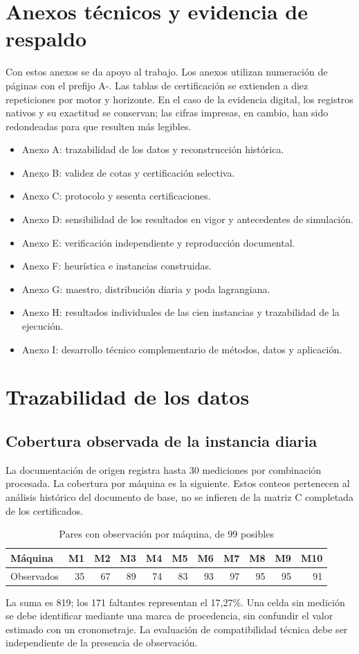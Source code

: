 \documentclass[12pt,a4paper,oneside]{article}
\begin{document}
\section*{Anexos técnicos y evidencia de respaldo}
Con estos anexos se da apoyo al trabajo. Los anexos utilizan numeración de páginas con el prefijo A-. Las tablas de certificación se extienden a diez repeticiones por motor y horizonte. En el caso de la evidencia digital, los registros nativos y su exactitud se conservan; las cifras impresas, en cambio, han sido redondeadas para que resulten más legibles.

\begin{itemize}
	\item Anexo A: trazabilidad de los datos y reconstrucción histórica.
	\item Anexo B: validez de cotas y certificación selectiva.
	\item Anexo C: protocolo y sesenta certificaciones.
	\item Anexo D: sensibilidad de los resultados en vigor y antecedentes de simulación.
	\item Anexo E: verificación independiente y reproducción documental.
	\item Anexo F: heurística e instancias construidas.
	\item Anexo G: maestro, distribución diaria y poda lagrangiana.
	\item Anexo H: resultados individuales de las cien instancias y trazabilidad de la ejecución.
	\item Anexo I: desarrollo técnico complementario de métodos, datos y aplicación.
\end{itemize}

\section{Trazabilidad de los datos}\label{an:datos}
\subsection{Cobertura observada de la instancia diaria}
La documentación de origen registra hasta 30 mediciones por combinación procesada. La cobertura por máquina es la siguiente. Estos conteos pertenecen al análisis histórico del documento de base, no se infieren de la matriz C completada de los certificados.
\begin{table}[H]\centering
\caption{Pares con observación por máquina, de 99 posibles}
\begin{tabular}{lrrrrrrrrrr}\toprule
Máquina&M1&M2&M3&M4&M5&M6&M7&M8&M9&M10\\\midrule
Observados&35&67&89&74&83&93&97&95&95&91\\\bottomrule
\end{tabular}
\end{table}
La suma es 819; los 171 faltantes representan el 17,27\%. Una celda sin medición se debe identificar mediante una marca de procedencia, sin confundir el valor estimado con un cronometraje. La evaluación de compatibilidad técnica debe ser independiente de la presencia de observación.
\end{document}
